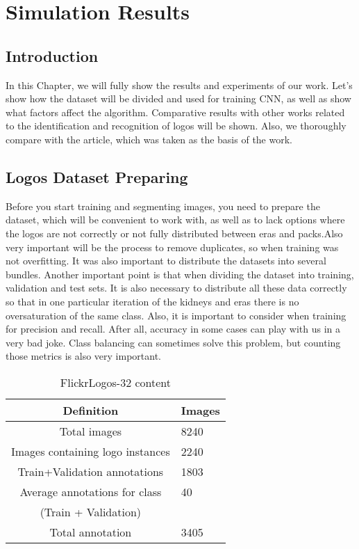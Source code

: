 \chapter{Simulation Results}\label{ch:E}
\section{Introduction}\label{sec:5.1}
\par In this Chapter, we will fully show the results and experiments of our work. Let's show how the dataset will be divided and used for training CNN, as well as show what factors affect the algorithm. Comparative results with other works related to the identification and recognition of logos will be shown. Also, we thoroughly compare with the article, which was taken as the basis of the work.


\section{Logos Dataset Preparing}\label{sec:5.2}
\par  Before you start training and segmenting images, you need to prepare the dataset, which will be convenient to work with, as well as to lack options where the logos are not correctly or not fully distributed between eras and packs.Also very important will be the process to remove duplicates, so when training was not overfitting. It was also important to distribute the datasets into several bundles. Another important point is that when dividing the dataset into training, validation and test sets. It is also necessary to distribute all these data correctly so that in one particular iteration of the kidneys and eras there is no oversaturation of the same class. Also, it is important to consider when training for precision and recall. After all, accuracy in some cases can play with us in a very bad joke. Class balancing can sometimes solve this problem, but counting those metrics is also very important.

\begin{table}[!hbp]
	\centering
	\caption{FlickrLogos-32 content}
	\label{tab:sample}
	\begin{tabular}{cl}
		\toprule
		Definition		 					&		Images 	\\ \midrule
		Total images  	 					& 		8240   	\\
		Images containing logo instances	&		2240   	\\
		Train+Validation annotations		&		1803	\\
		Average annotations for class		&		40		\\
		(Train + Validation)				& 				\\
		Total annotation					& 		3405	\\
		\bottomrule
	\end{tabular}
\end{table}


